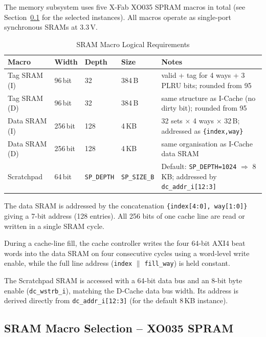 The memory subsystem uses five X-Fab XO035 SPRAM macros in total
(see Section~\ref{subsec:sramSelection} for the selected instances).
All macros operate as single-port synchronous SRAMs at 3.3\,V.

\begin{table}[H]
\caption{SRAM Macro Logical Requirements}
\label{tab:asSramMacros}
\centering
\begin{tabularx}{\textwidth}{|l |l |l |l |X|}
  \hline
  Macro & Width & Depth & Size & Notes \\
  \hline
  \hline
  Tag SRAM (I)  & 96\,bit  & 32   & 384\,B   & valid + tag for 4 ways + 3 PLRU bits; rounded from 95 \\
  \hline
  Tag SRAM (D)  & 96\,bit  & 32   & 384\,B   & same structure as I-Cache (no dirty bit); rounded from 95 \\
  \hline
  Data SRAM (I) & 256\,bit & 128  & 4\,KB    & 32 sets $\times$ 4 ways $\times$ 32\,B; addressed as \texttt{\{index,way\}} \\
  \hline
  Data SRAM (D) & 256\,bit & 128  & 4\,KB    & same organisation as I-Cache data SRAM \\
  \hline
  Scratchpad    & 64\,bit  & \texttt{SP\_DEPTH} & \texttt{SP\_SIZE\_B} &
    Default: \texttt{SP\_DEPTH=1024} $\Rightarrow$ 8\,KB;
    addressed by \texttt{dc\_addr\_i[12:3]} \\
  \hline
\end{tabularx}
\end{table}

The data SRAM is addressed by the concatenation \texttt{\{index[4:0], way[1:0]\}}
giving a 7-bit address (128 entries).
All 256 bits of one cache line are read or written in a single SRAM cycle.

During a cache-line fill, the cache controller writes the four 64-bit AXI4
beat words into the data SRAM on four consecutive cycles using a word-level
write enable, while the full line address (\texttt{index} $\parallel$
\texttt{fill\_way}) is held constant.

The Scratchpad SRAM is accessed with a 64-bit data bus and an 8-bit byte
enable (\texttt{dc\_wstrb\_i}), matching the D-Cache data bus width.
Its address is derived directly from \texttt{dc\_addr\_i[12:3]} (for the
default 8\,KB instance).

\subsection{SRAM Macro Selection -- XO035 SPRAM}
\label{subsec:sramSelection}

